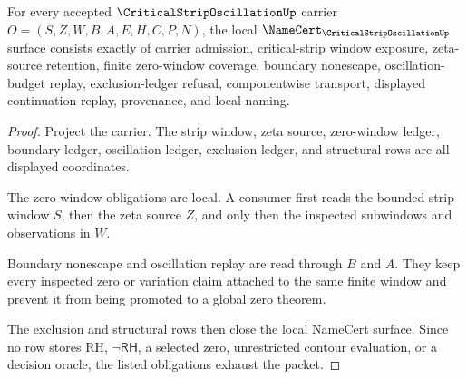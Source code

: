 \begin{theorem}
\label{thm:critical-strip-oscillation-namecert-obligations}
For every accepted $\CriticalStripOscillationUp$ carrier $O=(S,Z,W,B,A,E,H,C,P,N)$, the local $\NameCert_{\CriticalStripOscillationUp}$ surface consists exactly of carrier admission, critical-strip window exposure, zeta-source retention, finite zero-window coverage, boundary nonescape, oscillation-budget replay, exclusion-ledger refusal, componentwise transport, displayed continuation replay, provenance, and local naming.
\end{theorem}
\begin{proof}
Project the carrier. The strip window, zeta source, zero-window ledger, boundary ledger, oscillation ledger, exclusion ledger, and structural rows are all displayed coordinates.

The zero-window obligations are local. A consumer first reads the bounded strip window $S$, then the zeta source $Z$, and only then the inspected subwindows and observations in $W$.

Boundary nonescape and oscillation replay are read through $B$ and $A$. They keep every inspected zero or variation claim attached to the same finite window and prevent it from being promoted to a global zero theorem.

The exclusion and structural rows then close the local NameCert surface. Since no row stores RH, $\neg\mathsf{RH}$, a selected zero, unrestricted contour evaluation, or a decision oracle, the listed obligations exhaust the packet.
\end{proof}

